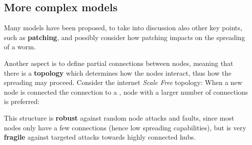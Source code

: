 \subsection{More complex models}
Many models have been proposed, to take into discussion also other key points,
such as \textbf{patching},
and possibly consider how patching impacts on the spreading of a worm.

Another aspect is to define partial connections between nodes,
meaning that there is a \textbf{topology} which determines how the nodes interact,
thus how the spreading may proceed.
Consider the internet \textit{Scale Free} topology:
When a new node is connected the connection to a , node with
a larger number of connections is preferred:

This structure is \textbf{robust} against random node attacks and faults,
since most nodes only have a few connections (hence low spreading capabilities),
but is very \textbf{fragile} against targeted attacks towards highly connected hubs.
